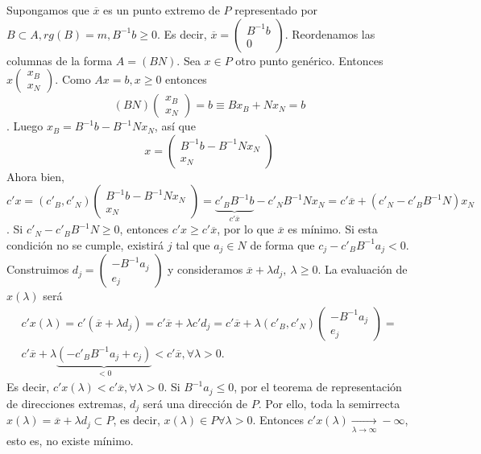 \documentclass[PM.tex]{subfiles}
\begin{document}
Supongamos que $\overline{x}$ es un punto extremo de $P$ representado por $B\subset A, rg(B)=m, B^{-1}b\geq 0$. Es decir, $\overline{x}=\begin{pmatrix}
B^{-1}b\\
0
\end{pmatrix}$. Reordenamos las columnas de la forma $A=(B N)$. Sea $x\in P$ otro punto genérico. Entonces $x\begin{pmatrix}
x_B\\
x_N
\end{pmatrix}$. Como $Ax=b, x\geq 0$ entonces
\[ (B N) \begin{pmatrix}
x_B\\
x_N
\end{pmatrix}= b\equiv Bx_B + Nx_N=b\].
Luego $x_B=B^{-1}b-B^{-1}Nx_N$, así que 
\[ x=\begin{pmatrix}
B^{-1}b-B^{-1}Nx_N\\
x_N
\end{pmatrix}\]
Ahora bien, $c'x=(c'_B, c'_N)\begin{pmatrix}
B^{-1}b-B^{-1}Nx_N\\
x_N
\end{pmatrix}=\underbrace{c'_B B^{-1}b}_{c'\overline{x}}-c'_N B^{-1}Nx_N=c'\overline{x}+(c'_N-c'_BB^{-1}N)x_N$. Si $c'_N-c'_BB^{-1}N\geq 0$, entonces $c'x\geq c'\overline{x}$, por lo que $\overline{x}$ es mínimo. Si esta condición no se cumple, existirá $j$ tal que $a_j\in N$ de forma que $c_j-c'_BB^{-1}a_j<0$. Construimos $d_j=\begin{pmatrix}
-B^{-1}a_j\\
e_j
\end{pmatrix}$ y consideramos $\overline{x}+\lambda d_j,\ \lambda\geq 0$. La evaluación de $x(\lambda)$ será 
\begin{gather*}
c'x(\lambda)=c'(\overline{x}+\lambda d_j)=c'\overline{x}+\lambda c'd_j=c'\overline{x}+\lambda(c'_B, c'_N)\begin{pmatrix}
-B^{-1}a_j\\
e_j
\end{pmatrix}=\\
c'\overline{x}+\lambda\underbrace{(-c'_B B^{-1}a_j +c_j)}_{<0}< c'\overline{x}, \forall\lambda >0.
\end{gather*}
Es decir, $c'x(\lambda)<c'\overline{x}, \forall\lambda >0$. Si $B^{-1}a_j\leq 0$, por el teorema de representación de direcciones extremas, $d_j$ será una dirección de $P$. Por ello, toda la semirrecta $x(\lambda)=\overline{x}+\lambda d_j\subset P$, es decir, $x(\lambda)\in P\forall\lambda >0$. Entonces $c'x(\lambda)\underset{\lambda\to\infty}{\longrightarrow} -\infty$, esto es, no existe mínimo.
\end{document}
